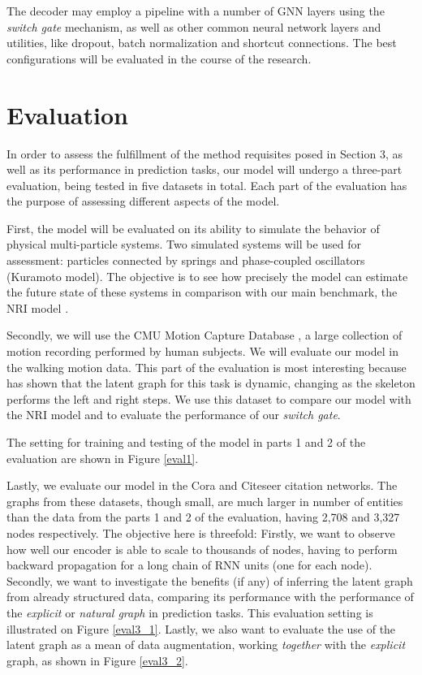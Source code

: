 \documentclass[12pt,a4paper]{article}
\begin{document}
	
	The decoder may employ a pipeline with a number of GNN layers using the \emph{switch gate} mechanism, as well as other common neural network layers and utilities, like dropout, batch normalization and shortcut connections. The best configurations will be evaluated in the course of the research. 
	
	\section{Evaluation}
	\label{sec:Evaluation}
	
	In order to assess the fulfillment of the method requisites posed in Section 3, as well as its performance in prediction tasks, our model will undergo a three-part evaluation, being tested in five datasets in total. Each part of the evaluation has the purpose of assessing different aspects of the model.
	
	First, the model will be evaluated on its ability to simulate the behavior of physical multi-particle systems. Two simulated systems will be used for assessment: particles connected by springs and phase-coupled oscillators (Kuramoto model). The objective is to see how precisely the model can estimate the future state of these systems in comparison with our main benchmark, the NRI model \citep{KipfNRI2018}. 
	
	Secondly, we will use the CMU Motion Capture Database \citep{CMU2003}, a large collection of motion recording performed by human subjects. We will evaluate our model in the walking motion data. This part of the evaluation is most interesting because \textcite{KipfNRI2018} has shown that the latent graph for this task is dynamic, changing as the skeleton performs the left and right steps. We use this dataset to compare our model with the NRI model and to evaluate the performance of our \emph{switch gate}.
	
	The setting for training and testing of the model in parts 1 and 2 of the evaluation are shown in Figure \ref{eval1}.
	
	Lastly, we evaluate our model in the Cora and Citeseer citation networks. The graphs from these datasets, though small, are much larger in number of entities than the data from the parts 1 and 2 of the evaluation, having 2,708 and 3,327 nodes respectively. The objective here is threefold: Firstly, we want to observe how well our encoder is able to scale to thousands of nodes, having to perform backward propagation for a long chain of RNN units (one for each node). Secondly, we want to investigate the benefits (if any) of inferring the latent graph from already structured data, comparing its performance with the performance of the \emph{explicit} or \emph{natural graph} in prediction tasks. This evaluation setting is illustrated on Figure \ref{eval3_1}. Lastly, we also want to evaluate the use of the latent graph as a mean of data augmentation, working \emph{together} with the \emph{explicit} graph, as shown in Figure \ref{eval3_2}.
	
\end{document}
